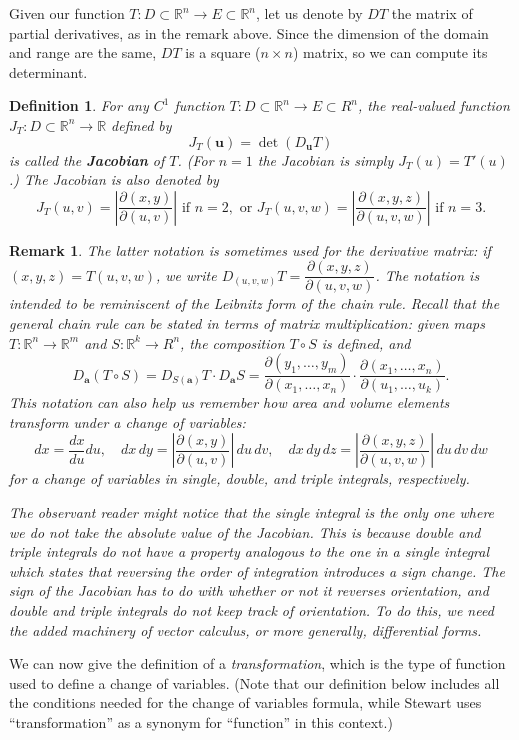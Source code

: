 \documentclass[12pt,letterpaper]{article}
\newtheorem{rem}[theorem]{Remark}
\newenvironment{remark}{\begin{rem}\rm}{\end{rem}}
\newtheorem{definition}[theorem]{Definition}
\newcommand{\R}{\mathbb{R}}
\newcommand{\uu}{\mathbf{u}}
\newcommand{\aaa}{\mathbf{a}}
\begin{document}
Given our function $T:D\subset \R^n\to E\subset \R^n$, let us denote by $DT$ the matrix of partial derivatives, as in the remark above. Since the dimension of the domain and range are the same, $DT$ is a square ($n\times n$) matrix, so we can compute its determinant.
\begin{definition}
For any $C^1$ function $T:D\subset \R^n\to E\subset R^n$, the real-valued function $J_T:D\subset \R^n\to \R$ defined by
\[
J_T(\uu) = \det (D_{\uu}T)
\]
is called the {\bf Jacobian} of $T$. (For $n=1$ the Jacobian is simply $J_T(u)=T'(u)$.) The Jacobian is also denoted by
\[
J_T(u,v) = \left|\frac{\partial(x,y)}{\partial (u,v)}\right|\text{ if } n=2, \text{ or } J_T(u,v,w) = \left|\frac{\partial (x,y,z)}{\partial (u,v,w)}\right| \text{ if } n=3.
\]
\end{definition}
\begin{remark}
The latter notation is sometimes used for the derivative matrix: if $(x,y,z) = T(u,v,w)$, we write $D_{(u,v,w)}T = \dfrac{\partial (x,y,z)}{\partial (u,v,w)}$. The notation is intended to be reminiscent of the Leibnitz form of the chain rule. Recall that the general chain rule can be stated in terms of matrix multiplication: given maps $T:\R^n\to \R^m$ and $S:\R^k\to R^n$, the composition $T\circ S$ is defined, and
\[
 D_\aaa(T\circ S) = D_{S(\aaa)}T\cdot D_\aaa S = \dfrac{\partial (y_1,\ldots, y_m)}{\partial (x_1,\ldots, x_n)}\cdot\dfrac{\partial (x_1,\ldots, x_n)}{\partial (u_1,\ldots, u_k)}.
\]
This notation can also help us remember how area and volume elements transform under a change of variables:
\[
dx = \frac{dx}{du}du,\quad dx\,dy = \left|\frac{\partial(x,y)}{\partial (u,v)}\right|\,du\,dv,\quad dx\,dy\,dz = \left|\frac{\partial (x,y,z)}{\partial (u,v,w)}\right|\,du\,dv\,dw
\]
for a change of variables in single, double, and triple integrals, respectively. 

The  observant reader might notice that the single integral is the only one where we do not take the absolute value of the Jacobian. This is because double and triple integrals do not have a property analogous to the one in a single integral which states that reversing the order of integration introduces a sign change. The sign of the Jacobian has to do with whether or not it reverses {\em orientation}, and double and triple integrals do not keep track of orientation. To do this, we need the added machinery of vector calculus, or more generally, differential forms.
\end{remark}
We can now give the definition of a {\em transformation}, which is the type of function used to define a change of variables. (Note that our definition below includes all the conditions needed for the change of variables formula, while Stewart uses ``transformation'' as a synonym for ``function'' in this context.)
\end{document}
